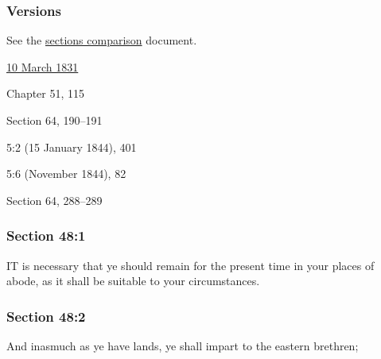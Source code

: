 	\subsubsection{Versions}
		\label{DC48-V}
		
		See the \href{https://drive.google.com/file/d/1goAvNz8jS4R8slYfMG_db55Ty2z_vmgK/view?usp=sharing}{sections comparison} document.
	
		\begin{compactdesc}
			\item[JSP] \hyperref[EMS-1831-JS-10-MAR-1831]{10 March 1831}
			\item[BC] Chapter 51, 115
			\item[DC 1835] Section 64, 190--191
			\item[TS] 5:2 (15 January 1844), 401
			\item[MS] 5:6 (November 1844), 82
			\item[DC 1844] Section 64, 288--289
		\end{compactdesc}

	\subsubsection{Section 48:1} %
		\label{DC48-1}

		IT is necessary that ye should remain for the present time in your places of abode, as it shall be suitable to your circumstances.


	\subsubsection{Section 48:2} %
		\label{DC48-2}

		And inasmuch as ye have lands, ye shall impart to the eastern brethren;


